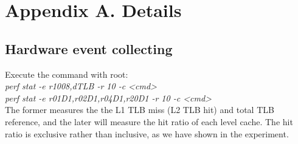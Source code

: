 \section{Appendix A. Details}
 \label{app a}

\subsection{Hardware event collecting}
Execute the command with root:\\
\emph{perf stat -e r1008,dTLB -r 10 -c <cmd>} \\
\emph{perf stat -e r01D1,r02D1,r04D1,r20D1 -r 10 -c <cmd>}\\
The former measures the the L1 TLB miss (L2 TLB hit) and total TLB reference, and the later will measure the hit ratio of each level cache. The hit ratio is exclusive rather than inclusive, as we have shown in the experiment.


